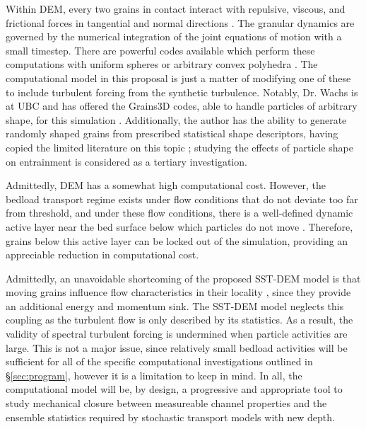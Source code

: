 Within DEM, every two grains in contact interact with repulsive, viscous, and frictional forces in tangential and normal directions \citep{Cundall1979,Dziugys2001}. The granular dynamics are governed by the numerical integration of the joint equations of motion with a small timestep. There are powerful codes available which perform these computations with uniform spheres \citep{Plimpton1995} or arbitrary convex polyhedra \citep{Wachs2012}. The computational model in this proposal is just a matter of modifying one of these to include turbulent forcing from the synthetic turbulence. Notably, Dr. Wachs is at UBC and has offered the Grains3D codes, able to handle particles of arbitrary shape, for this simulation \citep{Wachs2012}. Additionally, the author has the ability to generate randomly shaped grains from prescribed statistical shape descriptors, having copied the limited literature on this topic \citep{Mollon2013}; studying the effects of particle shape on entrainment is considered as a tertiary investigation.   
\bigskip 

Admittedly, DEM has a somewhat high computational cost. However, the bedload transport regime exists under flow conditions that do not deviate too far from threshold, and under these flow conditions, there is a well-defined dynamic active layer near the bed surface below which particles do not move \citep{Church2017}. Therefore, grains below this active layer can be locked out of the simulation, providing an appreciable reduction in computational cost. 
\bigskip 

Admittedly, an unavoidable shortcoming of the proposed SST-DEM model is that moving grains influence flow characteristics in their locality \citep{Ferreira2009, Singh2010, Santos2014, Liu2016}, since they provide an additional energy and momentum sink. The SST-DEM model neglects this coupling as the turbulent flow is only described by its statistics. As a result, the validity of spectral turbulent forcing is undermined when particle activities are large. This is not a major issue, since relatively small bedload activities will be sufficient for all of the specific computational investigations outlined in \S \ref{sec:program}, however it is a limitation to keep in mind. In all, the computational model will be, by design, a progressive and appropriate tool to study mechanical closure between measureable channel properties and the ensemble statistics required by stochastic transport models with new depth. 
\bigskip 


